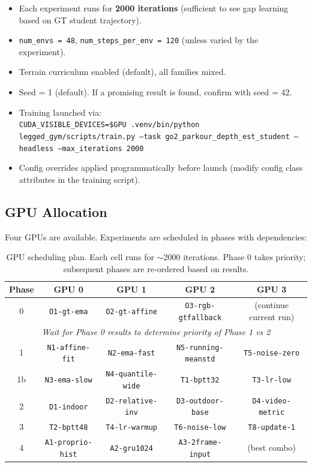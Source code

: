 \documentclass[11pt,a4paper]{article}
\begin{document}
\begin{itemize}[nosep]
  \item Each experiment runs for \textbf{2000 iterations} (sufficient to see
        gap learning based on GT student trajectory).
  \item \texttt{num\_envs = 48}, \texttt{num\_steps\_per\_env = 120}
        (unless varied by the experiment).
  \item Terrain curriculum enabled (default), all families mixed.
  \item Seed = 1 (default).  If a promising result is found, confirm with
        seed = 42.
  \item Training launched via:\\
        \texttt{CUDA\_VISIBLE\_DEVICES=\$GPU .venv/bin/python
        legged\_gym/scripts/train.py --task go2\_parkour\_depth\_est\_student
        --headless --max\_iterations 2000}
  \item Config overrides applied programmatically before launch (modify
        config class attributes in the training script).
\end{itemize}

\subsection{GPU Allocation}

Four GPUs are available.  Experiments are scheduled in phases with dependencies:

\begin{table}[h]
\centering
\begin{tabular}{ccccc}
\toprule
\textbf{Phase} & \textbf{GPU 0} & \textbf{GPU 1} & \textbf{GPU 2} & \textbf{GPU 3} \\
\midrule
0 & \texttt{O1-gt-ema} & \texttt{O2-gt-affine} & \texttt{O3-rgb-gtfallback} & (continue current run) \\
\midrule
\multicolumn{5}{c}{\emph{Wait for Phase 0 results to determine priority of Phase 1 vs 2}} \\
\midrule
1 & \texttt{N1-affine-fit} & \texttt{N2-ema-fast} & \texttt{N5-running-meanstd} & \texttt{T5-noise-zero} \\
1b & \texttt{N3-ema-slow} & \texttt{N4-quantile-wide} & \texttt{T1-bptt32} & \texttt{T3-lr-low} \\
\midrule
2 & \texttt{D1-indoor} & \texttt{D2-relative-inv} & \texttt{D3-outdoor-base} & \texttt{D4-video-metric} \\
\midrule
3 & \texttt{T2-bptt48} & \texttt{T4-lr-warmup} & \texttt{T6-noise-low} & \texttt{T8-update-1} \\
\midrule
4 & \texttt{A1-proprio-hist} & \texttt{A2-gru1024} & \texttt{A3-2frame-input} & (best combo) \\
\bottomrule
\end{tabular}
\caption{GPU scheduling plan.  Each cell runs for $\sim$2000 iterations.
Phase 0 takes priority; subsequent phases are re-ordered based on results.}
\label{tab:gpu_schedule}
\end{table}
\end{document}
